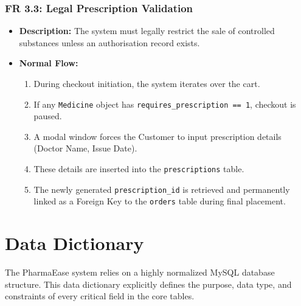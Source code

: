 \documentclass[12pt,a4paper]{report}
\begin{document}
\subsection{FR 3.3: Legal Prescription Validation}
\begin{itemize}
    \item \textbf{Description:} The system must legally restrict the sale of controlled substances unless an authorisation record exists.
    \item \textbf{Normal Flow:}
        \begin{enumerate}
            \item During checkout initiation, the system iterates over the cart.
            \item If any \texttt{Medicine} object has \texttt{requires\_prescription == 1}, checkout is paused.
            \item A modal window forces the Customer to input prescription details (Doctor Name, Issue Date).
            \item These details are inserted into the \texttt{prescriptions} table.
            \item The newly generated \texttt{prescription\_id} is retrieved and permanently linked as a Foreign Key to the \texttt{orders} table during final placement.
        \end{enumerate}
\end{itemize}

\clearpage

\chapter{Data Dictionary}

The PharmaEase system relies on a highly normalized MySQL database structure. This data dictionary explicitly defines the purpose, data type, and constraints of every critical field in the core tables.
\end{document}
